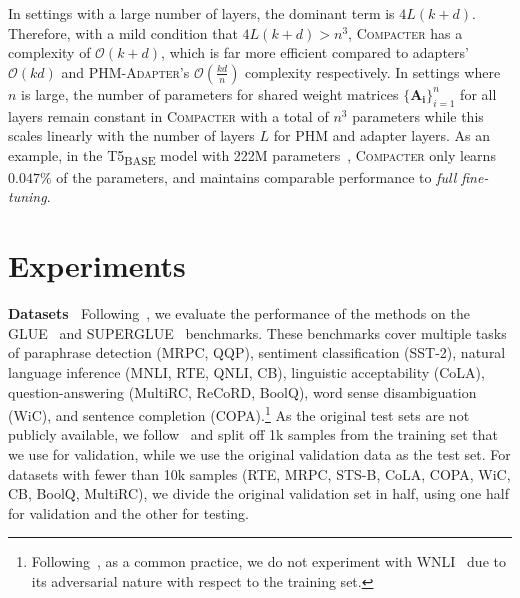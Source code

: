 \documentclass{article}
\newcommand{\basebase}{T5\textsubscript{\tiny BASE}\xspace}
\newcommand{\compacter}{\textsc{Compacter}\xspace}
\newcommand{\phmadapter}{\textsc{PHM-Adapter}\xspace}
\newcommand{\compacterrate}{$0.047\%$\xspace}
\begin{document}
In settings with a large number of layers, the dominant term is $4L(k+d)$. Therefore, with a mild condition that $4L(k+d)>n^3$, \compacter has a complexity of $\mathcal{O}(k+d)$, which is far more efficient compared to adapters' $\mathcal{O}(kd)$ and \phmadapter's $\mathcal{O}(\frac{kd}{n})$ complexity respectively. In settings where $n$ is large, the number of parameters for shared weight matrices $\{\bm{A_i}\}_{i=1}^n$ for all layers remain constant in \compacter with a total of $n^3$ parameters while this scales linearly with the number of layers $L$ for PHM and adapter layers.
 As an example, in the \basebase model with 222M parameters~\citep{raffel2019exploring}, \compacter only learns \compacterrate of the parameters, and maintains comparable performance to \emph{full fine-tuning}.


\vspace{-0.5em}
\section{Experiments} \label{sec:experiments}
\noindent \textbf{Datasets} $\:$ Following~\citet{raffel2019exploring}, we evaluate the performance of the methods on the GLUE~\citep{wang2018glue} and SUPERGLUE~\citep{wang2019superglue} benchmarks. These benchmarks cover multiple tasks of paraphrase detection (MRPC, QQP), sentiment classification (SST-2), natural language
inference (MNLI, RTE, QNLI, CB), linguistic acceptability (CoLA), question-answering (MultiRC, ReCoRD, BoolQ), word sense disambiguation (WiC), and sentence completion (COPA).\footnote{
Following~\citet{raffel2019exploring, devlin2019bert}, as a common practice, we do not experiment with WNLI~\citep{levesque2012winograd} due to its adversarial nature with respect to the training set.} As the original test sets are not publicly available, we follow~\citet{zhang2020revisiting} and split off 1k samples from the training set that we use for validation, while we use the original validation data as the test set. For datasets with fewer than 10k samples (RTE, MRPC, STS-B, CoLA, COPA, WiC, CB, BoolQ, MultiRC),  we divide the original validation set in half, using one half for validation and the other for testing.
\end{document}
